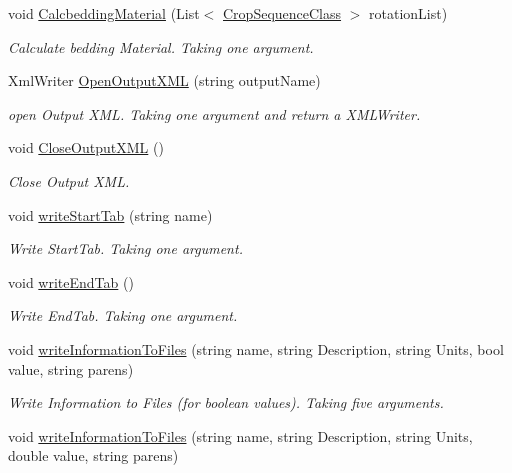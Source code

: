 \begin{DoxyCompactItemize}
void \mbox{\hyperlink{class_global_vars_a0646815f7f1f52f4b870f0cde29b0109}{Calcbedding\+Material}} (List$<$ \mbox{\hyperlink{class_crop_sequence_class}{Crop\+Sequence\+Class}} $>$ rotation\+List)
\begin{DoxyCompactList}\small\item\em Calculate bedding Material. Taking one argument. \end{DoxyCompactList}\item 
Xml\+Writer \mbox{\hyperlink{class_global_vars_a7391bb9604228a9d2a281cb33f77961e}{Open\+Output\+X\+ML}} (string output\+Name)
\begin{DoxyCompactList}\small\item\em open Output X\+ML. Taking one argument and return a X\+M\+L\+Writer. \end{DoxyCompactList}\item 
void \mbox{\hyperlink{class_global_vars_a7c7a6c35950707c1982a5a5148294c8d}{Close\+Output\+X\+ML}} ()
\begin{DoxyCompactList}\small\item\em Close Output X\+ML. \end{DoxyCompactList}\item 
void \mbox{\hyperlink{class_global_vars_a92285c751d72b917a757414a0ec47c34}{write\+Start\+Tab}} (string name)
\begin{DoxyCompactList}\small\item\em Write Start\+Tab. Taking one argument. \end{DoxyCompactList}\item 
void \mbox{\hyperlink{class_global_vars_a0622b1088cb0857945702489c0edc4e5}{write\+End\+Tab}} ()
\begin{DoxyCompactList}\small\item\em Write End\+Tab. Taking one argument. \end{DoxyCompactList}\item 
void \mbox{\hyperlink{class_global_vars_afabbc57efc23ce430454ada8a6439f81}{write\+Information\+To\+Files}} (string name, string Description, string Units, bool value, string parens)
\begin{DoxyCompactList}\small\item\em Write Information to Files (for boolean values). Taking five arguments. \end{DoxyCompactList}\item 
void \mbox{\hyperlink{class_global_vars_a1d78ceec4b54b5e794984056a7ee3176}{write\+Information\+To\+Files}} (string name, string Description, string Units, double value, string parens)

\end{DoxyCompactItemize}
